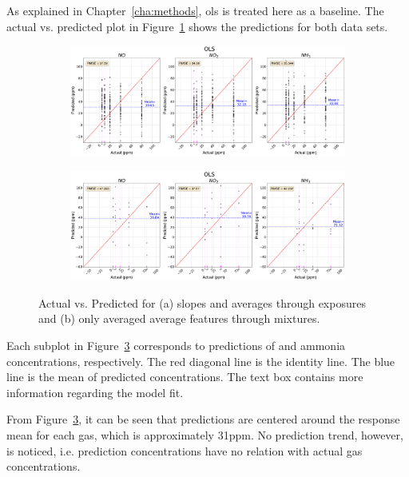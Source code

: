 As explained in Chapter~\ref{cha:methods}, \acrshort{ols} is treated here as a baseline. The actual vs. predicted plot in Figure~\ref{fig:ols-exposures} shows the predictions for both data sets.

\begin{figure}[!htb]
	\centering
	
	\begin{subfigure}[b]{1\textwidth}
		\includegraphics[width=1\linewidth]{../figures/ols-act-vs-pred.png}
		\caption{}
		\label{fig:ols-exposures} 
	\end{subfigure}
	
	\begin{subfigure}[b]{1\textwidth}
		\includegraphics[width=1\linewidth]{../figures/ols-avg-act-vs-pred.png}
		\caption{}
		\label{fig:ols-averaged}
	\end{subfigure}
	
	\caption{Actual vs. Predicted for (a) slopes and averages through exposures and (b) only averaged average features through mixtures.}
	\label{fig:ols-both}
\end{figure}

Each subplot  in Figure~\ref{fig:ols-both} corresponds to predictions of \nox and ammonia concentrations, respectively. The red diagonal line is the identity line. The blue line is the mean of predicted concentrations. The text box contains more information regarding the model fit. 

From Figure~\ref{fig:ols-both}, it can be seen that predictions are centered around the response mean for each gas, which is approximately 31\acrshort{ppm}. No prediction trend, however, is noticed, i.e. prediction concentrations have no relation with actual gas concentrations.


